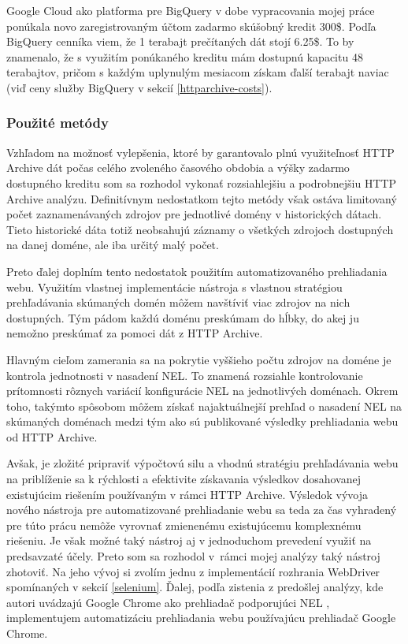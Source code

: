 Google Cloud ako platforma pre BigQuery v dobe vypracovania mojej práce ponúkala novo zaregistrovaným účtom zadarmo skúšobný
kredit 300\$. 
Podľa BigQuery cenníka viem, že 1 terabajt prečítaných dát stojí 6.25\$.
To by znamenalo, že s využitím ponúkaného kreditu mám dostupnú kapacitu 48 terabajtov, 
pričom s každým uplynulým mesiacom získam ďalší terabajt naviac (viď ceny služby BigQuery v sekcií \ref{httparchive-costs}).

\subsubsection{Použité metódy}

Vzhľadom na možnosť vylepšenia, ktoré by garantovalo plnú využiteľnosť HTTP Archive dát počas celého zvoleného časového obdobia a výšky zadarmo dostupného kreditu
som sa rozhodol vykonať rozsiahlejšiu a podrobnejšiu HTTP Archive analýzu.
Definitívnym nedostatkom tejto metódy však ostáva limitovaný počet zaznamenávaných zdrojov pre jednotlivé domény v historických dátach.
Tieto historické dáta totiž neobsahujú záznamy o všetkých zdrojoch dostupných na danej doméne, ale iba určitý malý počet.

Preto ďalej doplním tento nedostatok použitím automatizovaného prehliadania webu.
Využitím vlastnej implementácie nástroja s vlastnou stratégiou prehľadávania skúmaných domén môžem navštíviť viac zdrojov na nich dostupných. 
Tým pádom každú doménu preskúmam do hĺbky, do akej ju nemožno preskúmať za pomoci dát z HTTP Archive. 

Hlavným cieľom zamerania sa na pokrytie vyššieho počtu zdrojov na doméne je kontrola jednotnosti v nasadení NEL.
To znamená rozsiahle kontrolovanie prítomnosti rôznych variácií konfigurácie NEL na jednotlivých doménach.
Okrem toho, takýmto spôsobom môžem získať najaktuálnejší prehľad o nasadení NEL na skúmaných doménach medzi tým ako sú publikované výsledky prehliadania webu od HTTP Archive.

Avšak, je zložité pripraviť výpočtovú silu a vhodnú stratégiu prehľadávania webu na priblíženie sa k rýchlosti a efektivite získavania výsledkov dosahovanej existujúcim riešením používaným v rámci HTTP Archive.
Výsledok vývoja nového nástroja pre automatizované prehliadanie webu sa teda za čas vyhradený pre túto prácu nemôže vyrovnať zmienenému existujúcemu komplexnému riešeniu.
Je však možné taký nástroj aj v jednoduchom prevedení využiť na predsavzaté účely.
Preto som sa rozhodol \mbox{v rámci} mojej analýzy taký nástroj zhotoviť.
Na jeho vývoj si zvolím jednu z implementácií rozhrania WebDriver spomínaných v sekcií \ref{selenium}.
Ďalej, podľa zistenia z predošlej analýzy, kde autori uvádzajú Google Chrome ako prehliadač podporujúci NEL \cite{nel-http-archive}, implementujem automatizáciu prehliadania webu používajúcu prehliadač Google Chrome.

